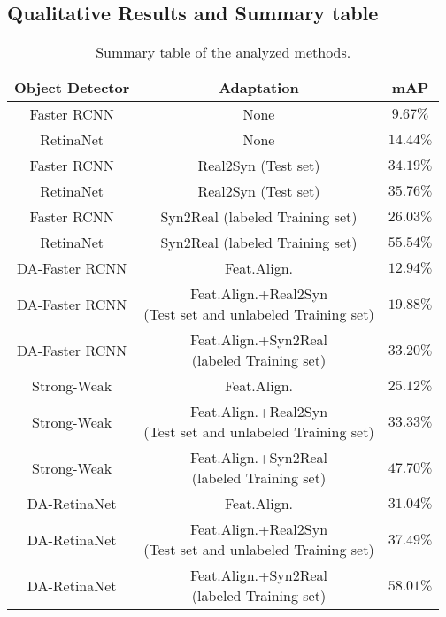 \documentclass[preprint]{elsarticle}
\begin{document}
\subsection{Qualitative Results and Summary table}
\begin{table}[t!]
\caption{Summary table of the analyzed methods.}
\label{tab:summary}
\centering
\begin{tabular}{|c||c||c|}
\hline
Object Detector & Adaptation & mAP\\
\hline
Faster RCNN & None & $9.67\%$ \\
\hline
RetinaNet & None & $14.44\%$ \\
\hline
Faster RCNN & Real2Syn (Test set) & $34.19\%$ \\ 
\hline
RetinaNet & Real2Syn (Test set) & $35.76\%$ \\
\hline
Faster RCNN & Syn2Real (labeled Training set) & $26.03\%$ \\
\hline
RetinaNet & Syn2Real (labeled Training set) & $55.54\%$ \\
\hline
DA-Faster RCNN & Feat.Align. & $12.94\%$ \\
\hline
DA-Faster RCNN &
\shortstack{Feat.Align.+Real2Syn \\ (Test set and unlabeled Training set)}& $19.88\%$ \\
\hline
DA-Faster RCNN &\shortstack{Feat.Align.+Syn2Real \\ (labeled Training set)} & $33.20\%$ \\
\hline
Strong-Weak & Feat.Align. & $25.12\%$ \\
\hline
Strong-Weak & \shortstack{Feat.Align.+Real2Syn \\ (Test set and unlabeled Training set)} & $33.33\%$ \\
\hline
Strong-Weak & \shortstack{Feat.Align.+Syn2Real \\ (labeled Training set)} & $47.70\%$ \\
\hline
DA-RetinaNet & Feat.Align. & $31.04\%$ \\
\hline
DA-RetinaNet & \shortstack{Feat.Align.+Real2Syn \\ (Test set and unlabeled Training set)} & $37.49\%$ \\
\hline
DA-RetinaNet & \shortstack{Feat.Align.+Syn2Real \\ (labeled Training set)} & $\mathbf{58.01\%}$ \\
\hline
\end{tabular}
\end{table}
\end{document}
